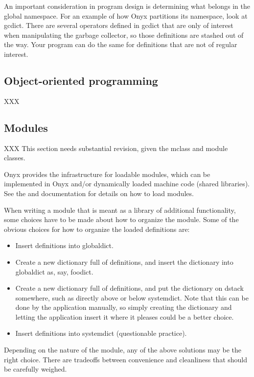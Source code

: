 An important consideration in program design is determining what belongs in the
global namespace.  For an example of how Onyx partitions its namespace, look at
gcdict.  There are several operators defined in gcdict that are only of interest
when manipulating the garbage collector, so those definitions are stashed out of
the way.  Your program can do the same for definitions that are not of regular
interest.

\subsection{Object-oriented programming}
\label{onyxtut:object_oriented_programming}
XXX

\subsection{Modules}
XXX This section needs substantial revision, given the mclass and module
classes.

Onyx provides the infrastructure for loadable modules, which can be implemented
in Onyx and/or dynamically loaded machine code (shared libraries).  See the
 and
 documentation for details
on how to load modules.

When writing a module that is meant as a library of additional functionality,
some choices have to be made about how to organize the module.  Some of the
obvious choices for how to organize the loaded definitions are:

\begin{itemize}
\item{Insert definitions into globaldict.}
\item{Create a new dictionary full of definitions, and insert the dictionary
  into globaldict as, say, foodict.}
\item{Create a new dictionary full of definitions, and put the dictionary on
  dstack somewhere, such as directly above or below systemdict.  Note that this
  can be done by the application manually, so simply creating the dictionary and
  letting the application insert it where it pleases could be a better choice.}
\item{Insert definitions into systemdict (questionable practice).}
\end{itemize}

Depending on the nature of the module, any of the above solutions may be the
right choice.  There are tradeoffs between convenience and cleanliness that
should be carefully weighed.


